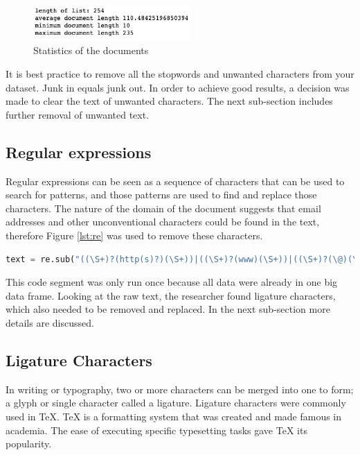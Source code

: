 \begin{figure}[h!]
\centering
\includegraphics[width=6cm]{./figures/docstats.png}
\caption{Statistics of the documents}
\label{fig:data}
\end{figure}

It is best practice to remove all the stopwords and unwanted characters from your dataset. Junk in equals junk out. In order to achieve good results, a decision was made to clear the text of unwanted characters. The next sub-section includes further removal of unwanted text.

\subsection{Regular expressions}

Regular expressions can be seen as a sequence of characters that can be used to search for patterns, and those patterns are used to find and replace those characters. The nature of the domain of the document suggests that email addresses and other unconventional characters could be found in the text, therefore Figure \ref{lst:re} was used to remove these characters.

\begin{lstlisting}[language=Python, label={lst:re}, caption=Regular Expression]
text = re.sub("((\S+)?(http(s)?)(\S+))|((\S+)?(www)(\S+))|((\S+)?(\@)(\S+)?)", " ", text)
\end{lstlisting}

This code segment was only run once because all data were already in one big data frame. Looking at the raw text, the researcher found ligature characters, which also needed to be removed and replaced. In the next sub-section more details are discussed.

\subsection{Ligature Characters} \label{ssec:ligature}

In writing or typography, two or more characters can be merged into one to form; a glyph or single character called a ligature. Ligature characters were commonly used in \TeX{}. \TeX{} is a formatting system that was created and made famous in academia. The ease of executing specific typesetting tasks gave \TeX{} its popularity.

